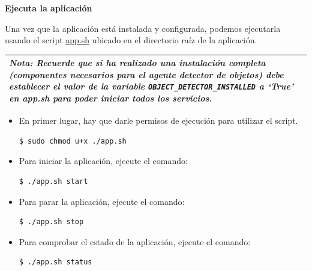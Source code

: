 \newpage

\textbf{Ejecuta la aplicación}

Una vez que la aplicación está instalada y configurada, podemos ejecutarla usando el script \href{https://github.com/jmv74211/TFM_security_system_PI/blob/master/app.sh}{app.sh} ubicado en el directorio raíz de la aplicación.

\vspace{0.3cm}

\begin{tabular}{|p{15.5cm}|}
	
	\hline
	
	\textit{\textbf{Nota}: Recuerde que si ha realizado una instalación completa (componentes necesarios para el agente detector de objetos) debe establecer el valor de la variable  \texttt{OBJECT\_DETECTOR\_INSTALLED} a `True' en app.sh para poder iniciar todos los servicios.}
	\\
	\hline
	
\end{tabular}


\begin{itemize}

\item En primer lugar, hay que darle permisos de ejecución para utilizar el script.

\vspace{-0.5cm}

\begin{verbatim}
$ sudo chmod u+x ./app.sh
\end{verbatim}

\vspace{-0.5cm}

\item Para iniciar la aplicación, ejecute el comando:

\vspace{-0.5cm}

\begin{verbatim}
$ ./app.sh start
\end{verbatim}

\vspace{-0.5cm}

\item Para parar la aplicación, ejecute el comando:

\vspace{-0.5cm}

\begin{verbatim}
$ ./app.sh stop
\end{verbatim}

\vspace{-0.5cm}

\item Para comprobar el estado de la aplicación, ejecute el comando:

\vspace{-0.5cm}

\begin{verbatim}
$ ./app.sh status
\end{verbatim}

\vspace{-0.3cm}


\end{itemize}

